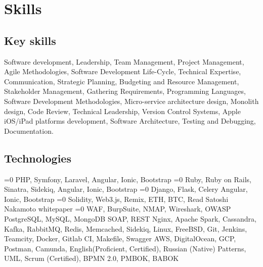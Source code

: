 \section{Skills}
\subsection{Key skills}
Software development, Leadership, Team Management, Project Management, Agile Methodologies, Software Development Life-Cycle, Technical Expertise, Communication, Strategic Planning, Budgeting and Resource Management, Stakeholder Management, Gathering Requirements,
Programming Languages, Software Development Methodologies, Micro-service architecture design, Monolith design, Code Review, Technical Leadership, Version Control Systems, Apple iOS/iPad platforms development, Software Architecture, Testing and Debugging, Documentation.
\subsection{Technologies}

\ifnum{}=0
PHP, Symfony, Laravel,
Angular, Ionic, Bootstrap
\fi
\ifnum{}=0
  Ruby, Ruby on Rails, Sinatra, Sidekiq,
  Angular, Ionic, Bootstrap
\fi
\ifnum{}=0
  Django, Flask, Celery
  Angular, Ionic, Bootstrap
\fi
\ifnum{}=0
  Solidity, Web3.js, Remix, ETH, BTC, Read Satoshi Nakamoto whitepaper
\fi
\ifnum{}=0
  WAF, BurpSuite, NMAP, Wireshark, OWASP
\fi
PostgreSQL, MySQL, MongoDB
SOAP, REST
Nginx, Apache Spark, Cassandra, Kafka, RabbitMQ, Redis, Memcached, Sidekiq,
Linux, FreeBSD, Git,
Jenkins, Teamcity, Docker, Gitlab CI, Makefile, Swagger
AWS, DigitalOcean, GCP,
Postman, Camunda,
English(Proficient, Certified), Russian (Native)
Patterns, UML, Scrum (Certified), BPMN 2.0, PMBOK, BABOK
